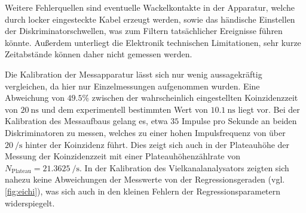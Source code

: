 Weitere Fehlerquellen sind eventuelle Wackelkontakte in der Apparatur, welche durch locker eingesteckte Kabel erzeugt werden, sowie das händische Einstellen der Diskriminatorschwellen, was zum Filtern tatsächlicher Ereignisse führen könnte. Außerdem unterliegt die Elektronik technischen Limitationen, sehr kurze Zeitabstände können daher nicht gemessen werden.

Die Kalibration der Messapparatur lässt sich nur wenig aussagekräftig vergleichen, da hier nur Einzelmessungen aufgenommen wurden.
Eine Abweichung von $\num{49.5}\%$ zwischen der wahrscheinlich eingestellten Koinzidenzzeit von $\SI{20}{\nano\second}$ und dem experimentell bestimmten Wert von $\SI{10.1}{\nano\second}$ liegt vor.
Bei der Kalibration des Messaufbaus gelang es, etwa $35$ Impulse pro Sekunde an beiden Diskriminatoren zu messen, welches zu einer hohen Impulsfrequenz von über $\SI{20}{\per\second}$ hinter der Koinzidenz führt. Dies zeigt sich auch in der Plateauhöhe der Messung der Koinzidenzzeit mit einer Plateauhöhenzählrate von $N_{\text{Plateau}}=\SI{21.3625}{\per\second}$.
In der Kalibration des Vielkanalanalysators zeigten sich nahezu keine Abweichungen der Messwerte von der Regressionsgeraden (vgl. \ref{fig:eichi}), was sich auch in den kleinen Fehlern der Regressionsparametern widerspiegelt.
